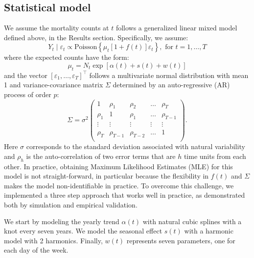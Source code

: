 \documentclass[11pt]{article}
\begin{document}
\subsection{Statistical model}
\label{subsec:statistical-model}
We assume the mortality counts at $t$ follows a generalized linear mixed model defined above, in the Results section. Specifically, we assume:
\begin{equation*}
    Y_t \mid \varepsilon_t \propto \mbox{Poisson}\left\{ \mu_t 
    \left[1 + f(t)\right]  \varepsilon_t \right\}, \mbox{ for } t = 1, \dots,T 
\end{equation*}
where the expected counts have the form:
\begin{equation*}
    \mu_t =N_t  \exp[\alpha(t) + s(t) + w(t)]
\end{equation*}
and the vector $[\varepsilon_1, \ldots, \varepsilon_T]^\top$ follows a multivariate normal distribution with mean 1 and variance-covariance matrix $\Sigma$ determined by an auto-regressive (AR) process of order $p$:
\begin{equation*}
    \Sigma = \sigma^2
    \begin{pmatrix} 1 & \rho_1 & \rho_{2} & \dots & \rho_{T} \\ 
    \rho_{1} & 1 & \rho_{1} & \ldots & \rho_{T-1} \\
    \vdots & \vdots & \vdots & \vdots & \vdots \\
    \rho_{T} & \rho_{T-1} & \rho_{T-2} & \dots & 1 \\ 
    \end{pmatrix}.
\end{equation*}
Here $\sigma$ corresponds to the standard deviation associated with natural variability and $\rho_h$ is the auto-correlation of two error terms that are $h$ time units from each other. In practice, obtaining Maximum Likelihood Estimates (MLE) for this model is not straight-forward, in particular because the flexibility in $f(t)$ and $\Sigma$ makes the model non-identifiable in practice. To overcome this challenge, we implemented a three step approach that works well in practice, as demonstrated both by simulation and empirical validation.

We start by modeling the yearly trend $\alpha(t)$ with natural cubic splines with a knot every seven years. We model the seasonal effect $s(t)$ with a harmonic model with 2 harmonics. Finally, $w(t)$
represents seven parameters, one for each day of the week. 
\end{document}

